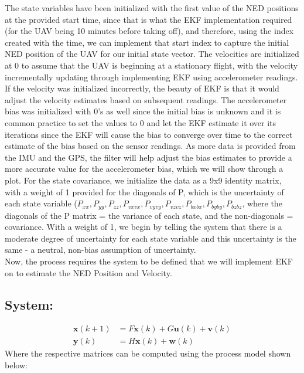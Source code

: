 The state variables have been initialized with the first value of the NED positions at the provided start time, since that is what the EKF implementation required (for the UAV being 10 minutes before taking off), and therefore, using the index created with the time, we can implement that start index to capture the initial NED position of the UAV for our initial state vector. The velocities are initialized at 0 to assume that the UAV is beginning at a stationary flight, with the velocity incrementally updating through implementing EKF using accelerometer readings. If the velocity was initialized incorrectly, the beauty of EKF is that it would adjust the velocity estimates based on subsequent readings. The accelerometer bias was initialized with 0's as well since the initial bias is unknown and it is common practice to set the values to 0 and let the EKF estimate it over its iterations since the EKF will cause the bias to converge over time to the correct estimate of the bias based on the sensor readings. As more data is provided from the IMU and the GPS, the filter will help adjust the bias estimates to provide a more accurate value for the accelerometer bias, which we will show through a plot. For the state covariance, we initialize the data as a 9x9 identity matrix, with a weight of 1 provided for the diagonals of P, which is the uncertainty of each state variable ($P_{xx}, P_{yy}, P_{zz}, P_{vxvx}, P_{vyvy}, P_{vzvz}, P_{bxbx}, P_{byby}, P_{bzbz}$, where the diagonals of the P matrix = the variance of each state, and the non-diagonals = covariance. With a weight of 1, we begin by telling the system that there is a moderate degree of uncertainty for each state variable and this uncertainty is the same - a neutral, non-bias assumption of uncertainty.\\

Now, the process requires the system to be defined that we will implement EKF on to estimate the NED Position and Velocity.
\subsection*{System:}

\begin{align}
    \mathbf{x}(k+1) &= F\mathbf{x}(k) + G\mathbf{u}(k) + \mathbf{v}(k) \\
    \mathbf{y}(k) &= H\mathbf{x}(k) + \mathbf{w}(k)
\end{align}
Where the respective matrices can be computed using the process model shown below:

